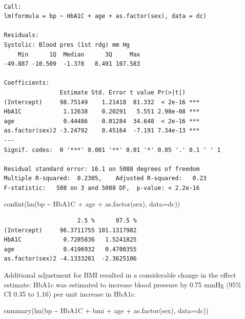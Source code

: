 \documentclass[
  letterpaper,
  DIV=11,
  numbers=noendperiod]{scrartcl}
\newenvironment{Shaded}{\begin{snugshade}}{\end{snugshade}}
\newcommand{\AttributeTok}[1]{\textcolor[rgb]{0.40,0.45,0.13}{#1}}
\newcommand{\FunctionTok}[1]{\textcolor[rgb]{0.28,0.35,0.67}{#1}}
\newcommand{\NormalTok}[1]{\textcolor[rgb]{0.00,0.23,0.31}{#1}}
\newcommand{\SpecialCharTok}[1]{\textcolor[rgb]{0.37,0.37,0.37}{#1}}
\begin{document}
\begin{verbatim}

Call:
lm(formula = bp ~ HbA1C + age + as.factor(sex), data = dc)

Residuals:
Systolic: Blood pres (1st rdg) mm Hg 
    Min      1Q  Median      3Q     Max 
-49.887 -10.509  -1.378   8.491 107.583 

Coefficients:
                Estimate Std. Error t value Pr(>|t|)    
(Intercept)     98.75149    1.21418  81.332  < 2e-16 ***
HbA1C            1.12638    0.20291   5.551 2.98e-08 ***
age              0.44486    0.01284  34.648  < 2e-16 ***
as.factor(sex)2 -3.24792    0.45164  -7.191 7.34e-13 ***
---
Signif. codes:  0 '***' 0.001 '**' 0.01 '*' 0.05 '.' 0.1 ' ' 1

Residual standard error: 16.1 on 5088 degrees of freedom
Multiple R-squared:  0.2305,    Adjusted R-squared:   0.23 
F-statistic:   508 on 3 and 5088 DF,  p-value: < 2.2e-16
\end{verbatim}

\begin{Shaded}
\begin{Highlighting}[]
\FunctionTok{confint}\NormalTok{(}\FunctionTok{lm}\NormalTok{(bp }\SpecialCharTok{\textasciitilde{}}\NormalTok{ HbA1C }\SpecialCharTok{+}\NormalTok{ age }\SpecialCharTok{+} \FunctionTok{as.factor}\NormalTok{(sex), }\AttributeTok{data=}\NormalTok{dc))}
\end{Highlighting}
\end{Shaded}

\begin{verbatim}
                     2.5 %      97.5 %
(Intercept)     96.3711755 101.1317982
HbA1C            0.7285836   1.5241825
age              0.4196932   0.4700355
as.factor(sex)2 -4.1333281  -2.3625106
\end{verbatim}

Additional adjustment for BMI resulted in a considerable change in the
effect estimate: HbA1c was estimated to increase blood pressure by 0.75
mmHg (95\% CI 0.35 to 1.16) per unit increase in HbA1c.

\begin{Shaded}
\begin{Highlighting}[]
\FunctionTok{summary}\NormalTok{(}\FunctionTok{lm}\NormalTok{(bp }\SpecialCharTok{\textasciitilde{}}\NormalTok{ HbA1C }\SpecialCharTok{+}\NormalTok{ bmi }\SpecialCharTok{+}\NormalTok{ age }\SpecialCharTok{+} \FunctionTok{as.factor}\NormalTok{(sex), }\AttributeTok{data=}\NormalTok{dc))}
\end{Highlighting}
\end{Shaded}
\end{document}

